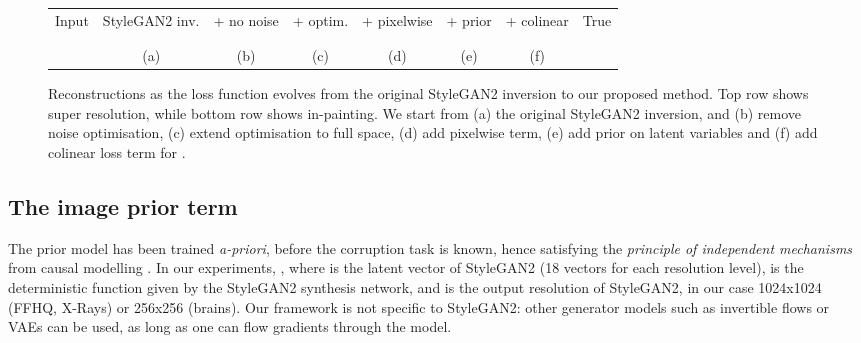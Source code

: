 \documentclass{article}
\newcommand{\inc}[1]{\raisebox{-.4\height}{\texttt{[image: \#1]}}}
\newcommand{\w}{2.5cm}
\newcommand{\wplus}{ }
\begin{document}
\newcommand{\nrE}{0014}
\newcommand{\nrEtwo}{0005}
\newcommand{\nrEthree}{0012}
\newcommand{\nrEfour}{0014}

\newcommand{\nrEI}{0000}



\renewcommand{\w}{1.75cm}

\newcommand{\fnt}{\fontsize{7}{9}\selectfont}

\fboxsep=-0.3pt

\begin{figure*}
\centering
\setlength{\tabcolsep}{0pt}
\begin{tabu}{cccccccc}
\rowfont{\fnt} Input & StyleGAN2 inv. & + no noise & + \wplus optim. & + pixelwise  & + prior  & + colinear & True\\
 \inc{\ei{\nrE}} &  \inc{\eo{\nrE}} & \inc{\en{\nrE}} & \inc{\ew{\nrE}} & \inc{\el{\nrE}} & \inc{\ep{\nrE}} & \inc{\ec{\nrE}} & \inc{\eh{\nrE}}\\
\inc{\eii{\nrEI}} &  \inc{\eio{\nrEI}} & \inc{\ein{\nrEI}} & \inc{\eiw{\nrEI}} & \inc{\eil{\nrEI}} & \inc{\eip{\nrEI}} & \inc{\eic{\nrEI}} & \inc{\eih{\nrEI}}\\
\rowfont{\fnt} &  (a) & (b) & (c) & (d) & (e) & (f) & \\
\end{tabu}
\caption{Reconstructions as the loss function evolves from the original StyleGAN2 inversion to our proposed method. Top row shows super resolution, while bottom row shows in-painting. We start from (a) the original StyleGAN2 inversion, and (b) remove noise optimisation, (c) extend optimisation to full \wplus space, (d) add pixelwise  term, (e) add prior on  latent variables and (f) add colinear loss term for . }
\label{evolution}
\end{figure*}
 
\subsection{The image prior term}  
\label{prior}
The prior model  has been trained \emph{a-priori}, before the corruption task is known, hence satisfying the \emph{principle of independent mechanisms} from causal modelling \cite{peters2017elements}. In our experiments, , where  is the latent vector of StyleGAN2 (18 vectors for each resolution level),  is the deterministic function given by the StyleGAN2 synthesis network, and  is the output resolution of StyleGAN2, in our case 1024x1024 (FFHQ, X-Rays) or 256x256 (brains). Our framework is not specific to StyleGAN2: other generator models such as invertible flows \cite{dinh2016density,kingma2018glow} or VAEs \cite{kingma2013auto} can be used, as long as one can flow gradients through the model. 
\end{document}
